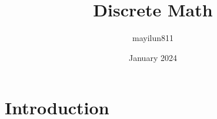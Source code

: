 \documentclass{article}
\title{Discrete Math}
\author{mayilun811 }
\date{January 2024}
\begin{document}
\maketitle

\section{Introduction}
\end{document}
